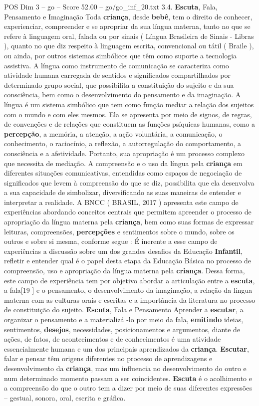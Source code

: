 \begin{textsample}{POS Dim 3 – go – Score 52.00 – go/go\_inf\_20.txt}  \label{ex:f3_pos_042}
3.4. \textbf{Escuta}, Fala, Pensamento e Imaginação Toda \textbf{criança}, desde \textbf{bebê}, tem o direito de conhecer, experienciar, compreender e se apropriar da sua língua materna, tanto no que se refere à linguagem oral, falada ou por sinais ( Língua Brasileira de Sinais - Libras ), quanto no que diz respeito à linguagem escrita, convencional ou tátil ( Braile ), ou ainda, por outros sistemas simbólicos que têm como suporte a tecnologia assistiva.
A língua como instrumento de comunicação se caracteriza como atividade humana carregada de sentidos e significados compartilhados por determinado grupo social, que possibilita a constituição do sujeito e da sua consciência, bem como o desenvolvimento do pensamento e da imaginação.
A língua é um sistema simbólico que tem como função mediar a relação dos sujeitos com o mundo e com eles mesmos.
Ela se apresenta por meio de signos, de regras, de convenções e de relações que constituem as funções psíquicas humanas, como a \textbf{percepção}, a memória, a atenção, a ação voluntária, a comunicação, o conhecimento, o raciocínio, a reflexão, a autorregulação do comportamento, a consciência e a afetividade.
Portanto, sua apropriação é um processo complexo que necessita de mediação.
A compreensão e o uso da língua pela \textbf{criança} em diferentes situações comunicativas, entendidas como espaços de negociação de significados que levem à compreensão do que se diz, possibilita que ela desenvolva a sua capacidade de simbolizar, diversificando as suas maneiras de entender e interpretar a realidade.
A BNCC ( BRASIL, 2017 ) apresenta este campo de experiências abordando conceitos centrais que permitem apreender o processo de apropriação da língua materna pela \textbf{criança}, bem como suas formas de expressar leituras, compreensões, \textbf{percepções} e sentimentos sobre o mundo, sobre os outros e sobre si mesma, conforme segue : É inerente a esse campo de experiências a discussão sobre um dos grandes desafios da Educação \textbf{Infantil}, refletir e entender qual é o papel desta etapa da Educação Básica no processo de compreensão, uso e apropriação da língua materna pela \textbf{criança}.
Dessa forma, este campo de experiência tem por objetivo abordar a articulação entre a \textbf{escuta}, a fala[19 ] e o pensamento, o desenvolvimento da imaginação, a relação da língua materna com as culturas orais e escritas e a importância da literatura no processo de constituição do sujeito. \textbf{Escuta}, Fala e Pensamento Aprender a \textbf{escutar}, a organizar o pensamento e a materializá -lo por meio da fala, \textbf{emitindo} ideias, sentimentos, \textbf{desejos}, necessidades, posicionamentos e argumentos, diante de ações, de fatos, de acontecimentos e de conhecimentos é uma atividade essencialmente humana e um dos principais aprendizados da \textbf{criança}. \textbf{Escutar}, falar e pensar têm origens diferentes no processo de aprendizagens e desenvolvimento da \textbf{criança}, mas um influencia no desenvolvimento do outro e num determinado momento passam a ser coincidentes. \textbf{Escuta} é o acolhimento e a compreensão do que o outro tem a dizer por meio de suas diferentes expressões – gestual, sonora, oral, escrita e gráfica.

\end{textsample}
